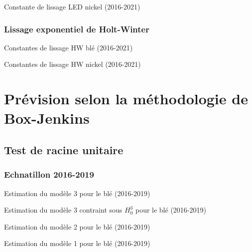 \documentclass[12pt,a4paper]{article}
\begin{document}
\begin{table}[H]
    \centering
    \caption{Constante de lissage LED nickel (2016-2021)}
    \sffamily
    
    \label{tab:led_nickel21}
\end{table}

\subsubsection{Lissage exponentiel de Holt-Winter}
\begin{table}[H]
    \centering
    \caption{Constantes de lissage HW blé (2016-2021)}
    \sffamily
    
    \label{tab:hw_ble}
\end{table}
\begin{table}[H]
    \centering
    \caption{Constantes de lissage HW nickel (2016-2021)}
    \sffamily
    
    \label{tab:hw_nickel}
\end{table}

\section{Prévision selon la méthodologie de Box-Jenkins}
\setcounter{table}{0}
\setcounter{figure}{0}
\subsection{Test de racine unitaire}
\subsubsection{Echnatillon 2016-2019}
\begin{table}[H]
    \centering
    \caption{Estimation du modèle 3 pour le blé (2016-2019)}
    \sffamily
    
    \label{tab:mod3_ble19}
\end{table}

\begin{table}[H]
    \centering
    \caption{Estimation du modèle 3 contraint sous $H_{0}^{3}$ pour le blé (2016-2019)}
    \sffamily
    
    \label{tab:mod3cont_ble19}
\end{table}

\begin{table}[H]
    \centering
    \caption{Estimation du modèle 2 pour le blé (2016-2019)}
    \sffamily
    
    \label{tab:mod2_ble19}
\end{table}

\begin{table}[H]
    \centering
    \caption{Estimation du modèle 1 pour le blé (2016-2019)}
    \sffamily
    
    \label{tab:mod1_ble19}
\end{table}
\end{document}
